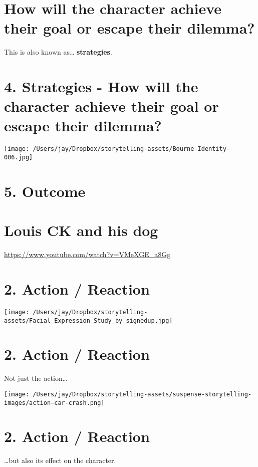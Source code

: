 \documentclass[12pt]{article}
\begin{document}
\section{\textbf{How} will the character achieve their goal or escape their dilemma?}
\label{sec:orgeff6923}
This is also known as\ldots{} \textbf{strategies}.


\section{4. Strategies - \textbf{How} will the character achieve their goal or escape their dilemma?}
\label{sec:org5b687d5}

\begin{center}
\texttt{[image: /Users/jay/Dropbox/storytelling-assets/Bourne-Identity-006.jpg]}
\end{center}


\section{5. Outcome}
\label{sec:orgd9572a9}


\section{Louis CK and his dog}
\label{sec:org8555bd2}
\url{https://www.youtube.com/watch?v=VMeXGE\_a8Gg}


\section{2. Action / Reaction}
\label{sec:org1fa8163}
\begin{center}
\texttt{[image: /Users/jay/Dropbox/storytelling-assets/Facial\_Expression\_Study\_by\_signedup.jpg]}
\end{center}

\section{2. Action / Reaction}
\label{sec:org032d430}
Not just the action\ldots{}

\begin{center}
\texttt{[image: /Users/jay/Dropbox/storytelling-assets/suspense-storytelling-images/action--car-crash.png]}
\end{center}

\section{2. Action / Reaction}
\label{sec:org7da8b15}
\ldots{}but also its effect on the character.
\end{document}
